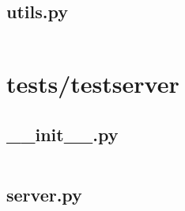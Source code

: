 \documentclass{article}
\begin{document}
\subsection{utils.py}
\inputminted{python}{/tmp/requests/tests/utils.py}
\newpage

\section{tests/testserver}

\subsection{\_\_init\_\_.py}
\inputminted{python}{/tmp/requests/tests/testserver/__init__.py}
\newpage

\subsection{server.py}
\inputminted{python}{/tmp/requests/tests/testserver/server.py}
\newpage


\end{document}
